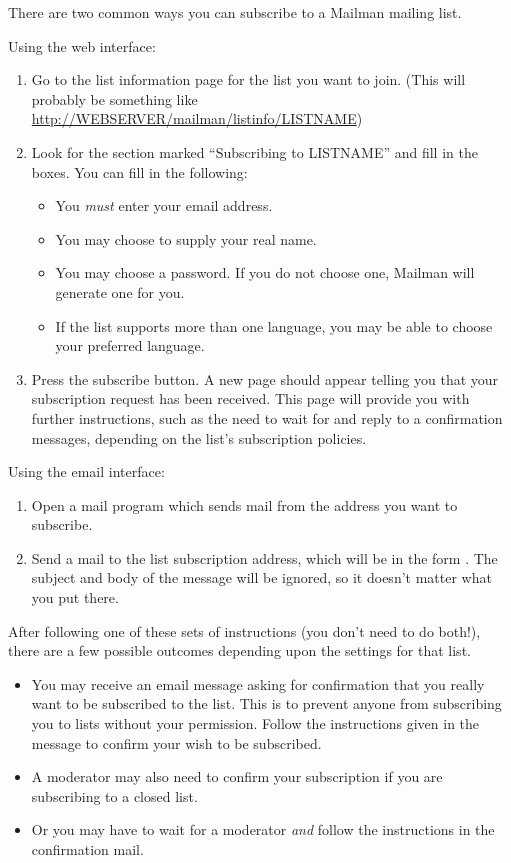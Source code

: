\documentclass{howto}
\begin{document}
There are two common ways you can subscribe to a Mailman mailing list. 

Using the web interface:
\begin{enumerate}
	\item Go to the list information page for the list you want to join. 
	(This will probably be something like 
	\url{http://WEBSERVER/mailman/listinfo/LISTNAME})
	\item Look for the section marked ``Subscribing to LISTNAME'' and fill in the 
	boxes.  You can fill in the following:
	\begin{itemize}
		\item You \emph{must} enter your email address.
		\item You may choose to supply your real name.
		\item You may choose a password.   If you do not choose one, Mailman will
		 generate one for you.  

		\item If the list supports more than one language, you may be able to 
		choose your preferred language.  
	\end{itemize}
	\item Press the subscribe button.  A new page should appear telling you 
	that your subscription request has been received.  This page will provide
	you with further instructions, such as the need to wait for and reply to a
	confirmation messages, depending on the list's subscription policies.
\end{enumerate}

Using the email interface:
\begin{enumerate}
	\item Open a mail program which sends mail from the address you want to
	subscribe.
	\item Send a mail to the list subscription address, which will be in the 
	form .  The subject and body
	of the message will be ignored, so it doesn't matter what you put there.
\end{enumerate}

After following one of these sets of instructions (you don't need to do
both!), there are a few possible outcomes depending upon the settings for
that list. 
\begin{itemize}
	\item You may receive an email message asking for confirmation that you 
really want to be subscribed to the list.  This is to prevent anyone from
subscribing you to lists without your permission.  Follow the instructions
given in the message to confirm your wish to be subscribed.
	\item A moderator may also need
to confirm your subscription if you are subscribing to a closed list.  
	\item Or
you may have to wait for a moderator \textit{and} follow the instructions in
the confirmation mail.
\end{itemize}
\end{document}
